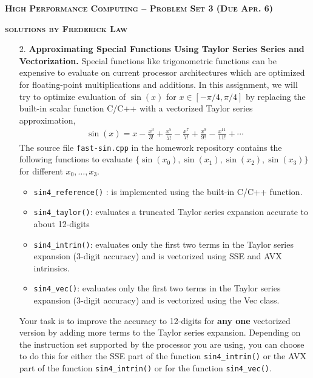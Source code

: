 \documentclass[10pt]{article}
\begin{document}
{ \large \textbf{\textsc{High Performance Computing -- Problem Set 3 (Due Apr. 6)}}}

{ \large \textbf{\textsc{solutions by Frederick Law}}}

\thispagestyle{empty}
\vspace{0.1in}


\begin{enumerate}

\item[2.] \textbf{Approximating Special Functions Using Taylor Series Series and Vectorization.} Special functions like trigonometric functions can be expensive to evaluate on current processor architectures which are optimized for floating-point multiplications and additions. In this assignment, we will try to optimize evaluation of $\sin(x)$ for $x \in [-\pi/4, \pi/4]$ by replacing the built-in scalar function C/C++ with a vectorized Taylor series approximation,
\begin{align*}
\sin (x) = x - \frac{x^{3}}{3!} + \frac{x^{5}}{5!} - \frac{x^{7}}{7!} + \frac{x^{9}}{9!} - \frac{x^{11}}{11!} + \cdots
\end{align*}
The source file \texttt{fast-sin.cpp} in the homework repository contains the following functions to evaluate $\{ \sin(x_{0}), \sin(x_{1}), \sin(x_{2}), \sin (x_{3})\}$ for different $x_{0}, \dotsc, x_{3}$.
\begin{itemize}
	\item \texttt{sin4\_reference()} : is implemented using the built-in C/C++ function.
	\item \texttt{sin4\_taylor()}: evaluates a truncated Taylor series expansion accurate to about 12-digits
	\item \texttt{sin4\_intrin()}: evaluates only the first two terms in the Taylor series expansion (3-digit accuracy) and is vectorized using SSE and AVX intrinsics.
	\item \texttt{sin4\_vec()}: evaluates only the first two terms in the Taylor series expansion (3-digit accuracy) and is vectorized using the Vec class.
\end{itemize}
Your task is to improve the accuracy to 12-digits for \textbf{any one} vectorized version by adding more terms to the Taylor series expansion. Depending on the instruction set supported by the processor you are using, you can choose to do this for either the SSE part of the function \texttt{sin4\_intrin()} or the AVX part of the function \texttt{sin4\_intrin()} or for the function \texttt{sin4\_vec()}.



\end{enumerate}
\end{document}
